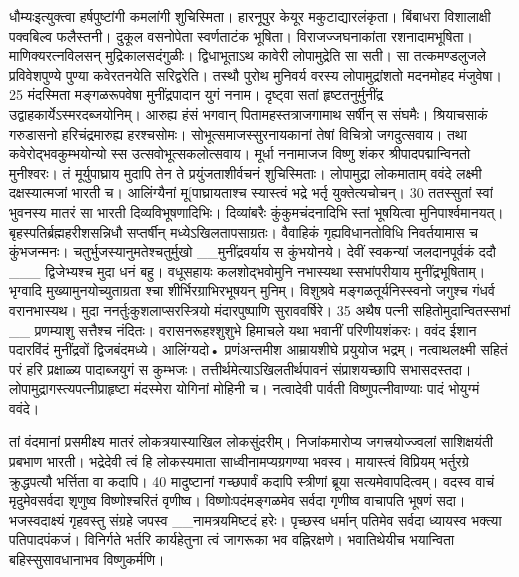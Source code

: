 धौम्यःइत्युक्त्वा हर्षपुष्टांगी कमलांगी शुचिस्मिता।
 हारनूपुर केयूर मकुटाद्यारलंकृता।
 बिंबाधरा विशालाक्षी पक्वबिल्व फलैस्तनी।
 दुकूल वसनोपेता स्वर्णताटंक भूषिता।
 विराजज्जघनाकांता रशनादामभूषिता।
 माणिक्यरत्नविलसन् मुद्रिकालसदंगुळीः।
 द्विधाभूताऽथ कावेरी लोपामुद्रेति सा सती।
 सा तत्कमण्डलुजले प्रविवेशपुण्ये
पुण्या कवेरतनयेति सरिद्वरेति।
 तस्थौ पुरोथ मुनिवर्य वरस्य
लोपामुद्रांशतो मदनमोहद मंजुवेषा।
 25 मंदस्मिता मङ्गळरूपवेषा मुनींद्रपादान युगं ननाम।
 दृष्ट्वा सतां हृष्टतनुर्मुनींद्र
उद्वाहकार्येऽस्मरदब्जयोनिम्।
 आरुह्य हंसं भगवान् पितामहस्तत्राजगामाथ
सर्षीन् स संघमैः।
 श्रियाचसाकं गरुडासनो
हरिचंद्रमारुह्य हरश्चसोमः।
 सोभूत्समाजस्सुरनायकानां तेषां
विचित्रो जगदुत्सवाय।
 तथा कवेरोद्भवकुम्भयोन्यो
स्स उत्सवोभूत्सकलोत्सवाय।
 मूर्धा ननामाजज विष्णु शंकर
श्रीपादपद्मान्विनतो मुनीश्वरः।
 तं मूर्युपाघ्राय मुदापि तेन ते
प्रयुंजताशीर्वचनं शुचिस्मिताः।
 लोपामुद्रा लोकमाताम् ववंदे लक्ष्मी
दक्षस्यात्मजां भारती च।
 आलिंग्यैनां मू[पाघ्रायताश्च स्यास्त्वं
भद्रे भर्तृ युक्तेत्यचोचन्।
 30 ततस्सुतां स्वां भुवनस्य मातरं
सा भारती दिव्यविभूषणादिभिः।
 दिव्यांबरैः कुंकुमचंदनादिभि स्तां
भूषयित्वा मुनिपार्श्वमानयत्।
 बृहस्पतिर्ब्रह्महरीशसन्निधौ
सप्तर्षीन् मध्येऽखिलतापसाग्रतः।
 वैवाहिकं गृह्यविधानतोविधि
निवर्तयामास च कुंभजन्मनः।
 चतुर्भुजस्यानुमतेश्चतुर्मुखो
__मुनींद्रवर्याय स कुंभयोनये।
 देवीं स्वकन्यां जलदानपूर्वकं ददौ
___ द्विजेभ्यश्च मुदा धनं बहु।
 वधूसहायः कलशोद्भवोमुनि
नभास्यथा
स्सभांपरीयाय मुनींद्रभूषिताम्।
 भृग्वादि मुख्यामुनयोच्युताग्रता
श्चा शीर्भिरग्राभिरभूषयन् मुनिम्।
 विशुश्रवे मङ्गळतूर्यनिस्स्वनो जगुश्च
गंधर्व वरानभास्यथ।
 मुदा ननर्तुःकुशलाप्सरस्त्रियो
मंदारपुष्पाणि सुराववर्षिरे।
35 अथैष पत्नी सहितोमुदान्वितस्सभां
__ प्रणम्याशु सत्तैश्च नंदितः।
 वरासनरूहश्शुशुभे हिमाचले यथा
भवानीं परिणीयशंकरः।
 ववंद ईशान पदारविंदं मुनींद्रवों द्विजबंदमध्ये।
 आलिंग्यदो• प्रणंअन्तमीश
आम्रायशीघे प्रयुयोज भद्रम्।
 नत्वाथलक्ष्मी सहितं परं हरि प्रक्षाळ्य
पादाब्जयुगं स कुम्भजः।
 तत्तीर्थमेत्याऽखिलतीर्थपावनं
संप्राशयच्छापि सभासदस्तदा।
 लोपामुद्रागस्त्यपत्नीप्राहृष्टा मंदस्मेरा
योगिनां मोहिनी च।
 नत्वादेवी पार्वती विष्णुपत्नीवाण्याः पादं
भोयुग्मं ववंदे।

तां वंदमानां प्रसमीक्ष्य मातरं
लोकत्रयास्याखिल लोकसुंदरीम्।
 निजांकमारोप्य जगत्त्रयोज्ज्वलां
साशिक्षयंती प्रबभाण भारती।
 भद्रेदेवी त्वं हि लोकस्यमाता
साध्वीनामप्यग्रगण्या भवस्व।
 मायास्त्वं विप्रियम् भर्तुरग्रे क्रुद्धपत्यौ
भर्त्तिता वा कदापि।
40 मादुष्टानां गच्छपार्वं कदापि
स्त्रीणां ब्रूया सत्यमेवापदित्वम्।
 वदस्व वाचं मृदुमेवसर्वदा शृणुष्व
विष्णोश्चरितं वृणीष्व।
 विष्णोःपदंमङ्गळमेव सर्वदा गृणीष्व
वाचापति भूषणं सदा।
 भजस्वदाक्ष्यं गृहवस्तु संग्रहे जपस्व
__नामत्रयमिष्टदं हरेः।
 पृच्छस्व धर्मान् पतिमेव सर्वदा ध्यायस्व
भक्त्या पतिपादपंकजं।
 विनिर्गते भर्तरि कार्यहेतुना त्वं जागरूका
भव वह्निरक्षणे।
 भवातिथेयीच भयान्विता
बहिस्सुसावधानाभव विष्णुकर्मणि।

